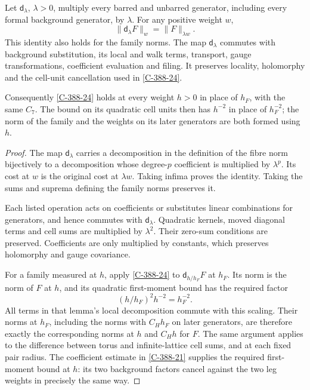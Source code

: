 \documentclass[11pt,letterpaper,reqno]{amsart}
\makeatletter
\theoremstyle{definition}
\newcommand{\ms@minorstart}{%
  \pushQED{\qed}\renewcommand{\qedsymbol}{$\blacksquare$}}
\newenvironment{lemma}[1][]{\ms@minorstart\ms@lemma[#1]}
  {\popQED\endms@lemma}
\theoremstyle{remark}
\makeatother
\begin{document}
\begin{lemma}[Changing the Grassmann weight]\label{C-398-41}
Let $\mathsf d_\lambda$, $\lambda>0$, multiply every barred and
unbarred generator, including every formal background generator,
by $\lambda$. For any positive weight $w$,
\[
 \|\mathsf d_\lambda F\|_w=\|F\|_{\lambda w}.
\]
This identity also holds for the family norms. The map
$\mathsf d_\lambda$ commutes with background substitution,
its local and walk terms, transport, gauge transformations,
coefficient evaluation and filing. It preserves locality,
holomorphy and the cell-unit cancellation used in
\cref{C-388-24}.

Consequently \cref{C-388-24} holds at every weight $h>0$
in place of $h_F$, with the same $C_7$. The bound on its
quadratic cell units then has $h^{-2}$ in place of $h_F^{-2}$;
the norm of the family and the weights on its later generators
are both formed using $h$.
\end{lemma}
\begin{proof}
The map $\mathsf d_\lambda$ carries a decomposition in the
definition of the fibre norm bijectively to a decomposition
whose degree-$p$ coefficient is multiplied by $\lambda^p$.
Its cost at $w$ is the original cost at $\lambda w$.
Taking infima proves the identity. Taking the sums and
suprema defining the family norms preserves it.

Each listed operation acts on coefficients or substitutes
linear combinations for generators, and hence commutes with
$\mathsf d_\lambda$. Quadratic kernels, moved diagonal terms
and cell sums are multiplied by $\lambda^2$. Their zero-sum
conditions are preserved. Coefficients are only multiplied
by constants, which preserves holomorphy and gauge covariance.

For a family measured at $h$, apply \cref{C-388-24} to
$\mathsf d_{h/h_F}F$ at $h_F$. Its norm is the norm of $F$
at $h$, and its quadratic first-moment bound has the required
factor
\[
 (h/h_F)^2h^{-2}=h_F^{-2}.
\]
All terms in that lemma's local decomposition commute with
this scaling. Their norms at $h_F$, including the norms with
$C_Hh_F$ on later generators, are therefore exactly the
corresponding norms at $h$ and $C_Hh$ for $F$.
The same argument applies to the difference between torus
and infinite-lattice cell sums, and at each fixed pair radius.
The coefficient estimate in \cref{C-388-21} supplies the
required first-moment bound at $h$: its two background factors
cancel against the two leg weights in precisely the same way.
\end{proof}
\end{document}
